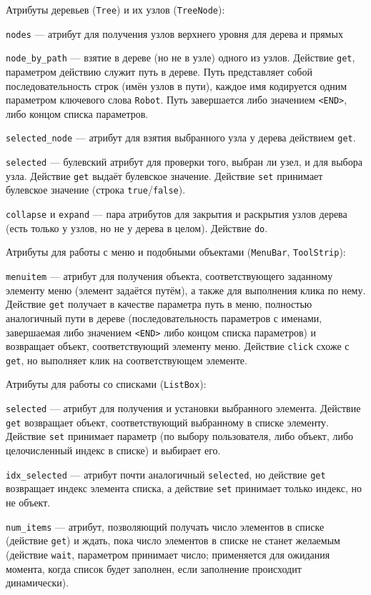 \documentclass[11pt]{book} %
\begin{document}
Атрибуты деревьев (\verb|Tree|) и их узлов (\verb|TreeNode|):

\verb|nodes| --- атрибут для получения узлов верхнего уровня для дерева и прямых 

\verb|node_by_path| --- взятие в дереве (но не в узле) одного из узлов. Действие \verb|get|, параметром действию служит путь в дереве. Путь представляет собой последовательность строк (имён узлов в пути), каждое имя кодируется одним параметром ключевого слова \verb|Robot|. Путь завершается либо значением \verb|<END>|, либо концом списка параметров.

\verb|selected_node| --- атрибут для взятия выбранного узла у дерева действием \verb|get|.

\verb|selected| --- булевский атрибут для проверки того, выбран ли узел, и для выбора узла. Действие \verb|get| выдаёт булевское значение. Действие \verb|set| принимает булевское значение (строка \verb|true|/\verb|false|).


\verb|collapse| и \verb|expand| --- пара атрибутов для закрытия и раскрытия узлов дерева (есть только у узлов, но не у дерева в целом). Действие \verb|do|.

Атрибуты для работы с меню и подобными объектами (\verb|MenuBar|, \verb|ToolStrip|):

\verb|menuitem| --- атрибут для получения объекта, соответствующего заданному элементу меню (элемент задаётся путём), а также для выполнения клика по нему. Действие \verb|get| получает в качестве параметра путь в меню, полностью аналогичный пути в дереве (последовательность параметров с именами, завершаемая либо значением \verb|<END>| либо концом списка параметров) и возвращает объект, соответствующий элементу меню. Действие \verb|click| схоже с \verb|get|, но выполняет клик на соответствующем элементе.

Атрибуты для работы со списками (\verb|ListBox|):

\verb|selected| --- атрибут для получения и установки выбранного элемента. Действие \verb|get| возвращает объект, соответствующий выбранному в списке элементу. Действие \verb|set| принимает параметр (по выбору пользователя, либо объект, либо целочисленный индекс в списке) и выбирает его.

\verb|idx_selected| --- атрибут почти аналогичный \verb|selected|, но действие \verb|get| возвращает индекс элемента списка, а действие \verb|set| принимает только индекс, но не объект.

\verb|num_items| --- атрибут, позволяющий получать число элементов в списке (действие \verb|get|) и ждать, пока число элементов в списке не станет желаемым (действие \verb|wait|, параметром принимает число; применяется для ожидания момента, когда список будет заполнен, если заполнение происходит динамически).
\end{document}
